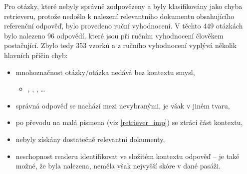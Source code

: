 Pro otázky, které nebyly správně zodpovězeny a byly klasifikovány jako chyba retrieveru, protože nedošlo k nalezení relevantního dokumentu obsahujícího referenční odpověď, bylo provedeno ruční vyhodnocení. V těchto 449 otázkách bylo nalezeno 96 odpovědí, které jsou při ručním vyhodnocení člověkem postačující. Zbylo tedy 353 vzorků a z ručního vyhodnocení vyplývá několik hlavních příčin chyb:
\begin{itemize}
    \item mnohoznačnost otázky/otázka nedává bez kontextu smysl,
    \begin{itemize}
        \item {}, , , \dots
    \end{itemize}
    \item správná odpověď se nachází mezi nevybranými, je však v jiném tvaru,
    \item po převodu na malá písmena (viz \ref{retriever_imp}) se ztrácí část kontextu,
    \item nebyly získány dostatečně relevantní dokumenty,
    \item neschopnost readeru identifikovat ve složitém kontextu odpověď -- je také možné, že byla nalezena, neměla však nejvyšší skóre v dané pasáži.
\end{itemize}

